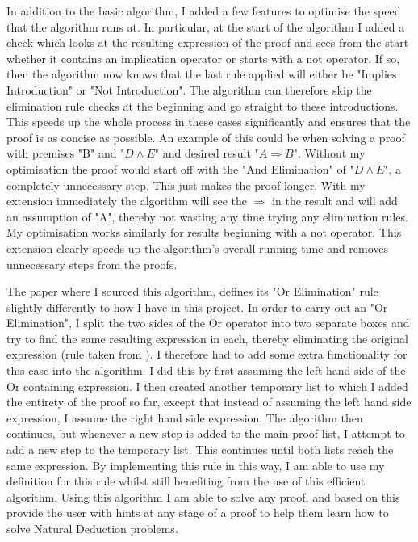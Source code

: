 In addition to the basic algorithm, I added a few features to optimise the speed that the algorithm runs at. In particular, at the start of the algorithm I added a check which looks at the resulting expression of the proof and sees from the start whether it contains an implication operator or starts with a not operator. If so, then the algorithm now knows that the last rule applied will either be "Implies Introduction" or "Not Introduction". The algorithm can therefore skip the elimination rule checks at the beginning and go straight to these introductions. This speeds up the whole process in these cases significantly and ensures that the proof is as concise as possible. An example of this could be when solving a proof with premises "B" and "$D \wedge E$" and desired result "$A \Rightarrow B$". Without my optimisation the proof would start off with the "And Elimination" of "$D \wedge E$", a completely unnecessary step. This just makes the proof longer. With my extension immediately the algorithm will see the $\Rightarrow$ in the result and will add an assumption of "A", thereby not wasting any time trying any elimination rules. My optimisation works similarly for results beginning with a not operator. This extension clearly speeds up the algorithm's overall running time and removes unnecessary steps from the proofs.

 The paper where I sourced this algorithm, defines its "Or Elimination" rule slightly differently to how I have in this project. In order to carry out an "Or Elimination", I split the two sides of the Or operator into two separate boxes and try to find the same resulting expression in each, thereby eliminating the original expression (rule taken from \cite{ndBook}). I therefore had to add some extra functionality for this case into the algorithm. I did this by first assuming the left hand side of the Or containing expression. I then created another temporary list to which I added the entirety of the proof so far, except that instead of assuming the left hand side expression, I assume the right hand side expression. The algorithm then continues, but whenever a new step is added to the main proof list, I attempt to add a new step to the temporary list. This continues until both lists reach the same expression. By implementing this rule in this way, I am able to use my definition for this rule whilst still benefiting from the use of this efficient algorithm. Using this algorithm I am able to solve any proof, and based on this provide the user with hints at any stage of a proof to help them learn how to solve Natural Deduction problems. 

